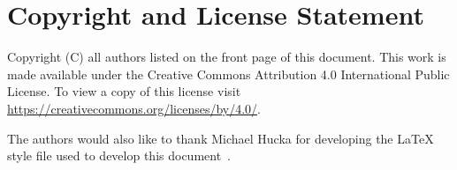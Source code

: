 \section{Copyright and License Statement}


Copyright (C) all authors listed on the front page of this document.
This work is made available under the Creative Commons Attribution 4.0 International Public License. To view a copy of this license visit \href{https://creativecommons.org/licenses/by/4.0/}{https://creativecommons.org/licenses/by/4.0/}.

The authors would also like to thank Michael Hucka for developing the LaTeX style file used to develop this document~\citep{hucka2017sbmlpkgspec}.
